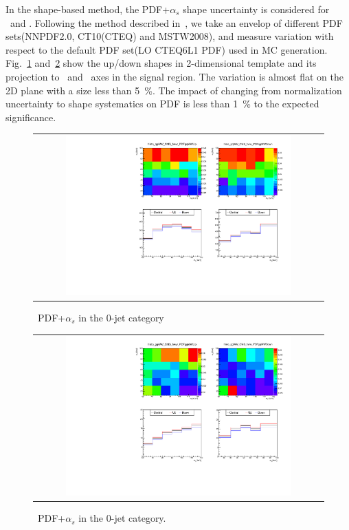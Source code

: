 In the shape-based method, the PDF+$\alpha_s$ shape uncertainty 
is considered for \qqww\ and \ggww.  
Following the method described in~\cite{pdfAN}, we take an envelop of different PDF 
sets(NNPDF2.0, CT10(CTEQ) and MSTW2008), and measure variation with respect to the default 
PDF set(LO CTEQ6L1 PDF) used in MC generation. 
Fig.~\ref{fig:alter_pdfqqww} and~\ref{fig:alter_pdfggww} show the up/down 
shapes in 2-dimensional template and its projection to \mT\ and \mll\ axes
in the signal region. 
The variation is almost flat on the 2D plane with a size less than 5~\%. 
The impact of changing from normalization uncertainty to shape systematics on PDF 
is less than 1~\% to the expected significance.
%
\begin{figure}[htp] 
\centering 
\begin{tabular}{c} 
\includegraphics[width=0.8\textwidth]{figures/histo_qqWW_CMS_hww_PDFqqWW_0j_zoom.pdf} 
\end{tabular} 
\caption{ \qqww\ PDF+$\alpha_s$ in the 0-jet category}
\label{fig:alter_pdfqqww} 
\end{figure} 
%
\begin{figure}[htp] 
\centering 
\begin{tabular}{c} 
\includegraphics[width=0.8\textwidth]{figures/histo_ggWW_CMS_hww_PDFggWW_0j_zoom.pdf} 
\end{tabular} 
\caption{ \ggww\ PDF+$\alpha_s$ in the 0-jet category.}
\label{fig:alter_pdfggww} 
\end{figure} 

